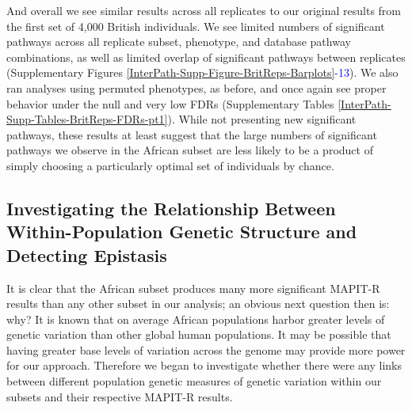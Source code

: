 \documentclass[12pt,a4paper]{article}
\begin{document}
And overall we see similar results across all replicates to our original results from the first set of 4,000 British individuals. We see limited numbers of significant pathways across all replicate subset, phenotype, and database pathway combinations, as well as limited overlap of significant pathways between replicates (Supplementary Figures \ref{InterPath-Supp-Figure-BritReps-Barplots}\textcolor{blue}{-13}). We also ran analyses using permuted phenotypes, as before, and once again see proper behavior under the null and very low FDRs (Supplementary Tables \ref{InterPath-Supp-Tables-BritReps-FDRs-pt1}). While not presenting new significant pathways, these results at least suggest that the large numbers of significant pathways we observe in the African subset are less likely to be a product of simply choosing a particularly optimal set of individuals by chance.  

\subsection{Investigating the Relationship Between Within-Population Genetic Structure and Detecting Epistasis}

It is clear that the African subset produces many more significant MAPIT-R results than any other subset in our analysis; an obvious next question then is: why? It is known that on average African populations harbor greater levels of genetic variation than other global human populations. It may be possible that having greater base levels of variation across the genome may provide more power for our approach. Therefore we began to investigate whether there were any links between different population genetic measures of genetic variation within our subsets and their respective MAPIT-R results.
\end{document}
